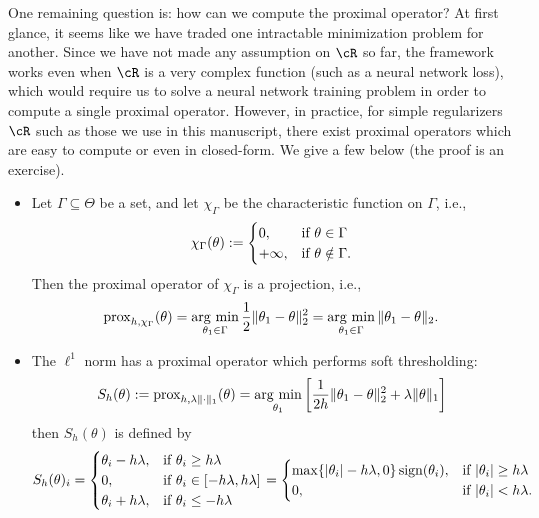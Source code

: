 \documentclass[../../book-main.tex]{subfiles}
\begin{document}
One remaining question is: how can we compute the proximal operator? At first glance, it seems like we have traded one intractable minimization problem for another. Since we have not made any assumption on \(\cR\) so far, the framework works even when \(\cR\) is a very complex function (such as a neural network loss), which would require us to solve a neural network training problem in order to compute a single proximal operator. However, in practice, for simple regularizers \(\cR\) such as those we use in this manuscript, there exist proximal operators which are easy to compute or even in closed-form. We give a few below (the proof is an exercise).
\begin{itemize}
    \item Let \(\Gamma \subseteq \Theta\) be a set, and let \(\chi_{\Gamma}\) be the characteristic function on \(\Gamma\), i.e.,
    \begin{equation}
        \chi_{\Gamma}(\theta) := \begin{cases}0, & \text{if}\ \theta \in \Gamma \\ +\infty, & \text{if}\ \theta \notin \Gamma.\end{cases}
    \end{equation}
    Then the proximal operator of \(\chi_{\Gamma}\) is a projection, i.e.,
    \begin{equation}
        \prox_{h, \chi_{\Gamma}}(\theta) = \argmin_{\theta_{1} \in \Gamma}\frac{1}{2}\norm{\theta_{1} - \theta}_{2}^{2} = \argmin_{\theta_{1} \in \Gamma}\norm{\theta_{1} - \theta}_{2}.
    \end{equation}
    \item The \(\ell^{1}\) norm has a proximal operator which performs soft thresholding:
    \begin{equation}
        S_{h}(\theta) := \prox_{h, \lambda \norm{\cdot}_{1}}(\theta) = \argmin_{\theta_{1}}\bs{\frac{1}{2h}\norm{\theta_{1} - \theta}_{2}^{2} + \lambda\norm{\theta}_{1}}
    \end{equation}
    then \(S_{h}(\theta)\) is defined by 
    \begin{equation}
        S_{h}(\theta)_{i} = \casework{\theta_{i} - h\lambda, & \text{if}\ \theta_{i} \geq h\lambda \\ 0, & \text{if}\ \theta_{i} \in [-h\lambda, h\lambda] \\ \theta_{i} + h\lambda, & \text{if}\ \theta_{i} \leq -h\lambda} = \casework{\max\{\abs{\theta_{i}} - h\lambda, 0\}\sign(\theta_{i}), & \text{if}\ \abs{\theta_{i}} \geq h\lambda \\ 0, & \text{if}\ \abs{\theta_{i}} < h\lambda.}
    \end{equation}

\end{itemize}
\end{document}
